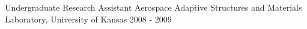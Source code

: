 \begin{cventries}
  \cventry
    {Undergraduate Research Assistant} %
    {Aerospace Adaptive Structures and Materials Laboratory, University of Kansas} %
    {} %
    {2008 - 2009} %
    {
    }


\end{cventries}
